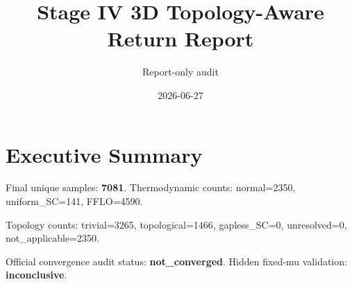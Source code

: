 \documentclass[11pt]{article}
\begin{document}
\title{Stage IV 3D Topology-Aware Return Report}
\author{Report-only audit}
\date{2026-06-27}
\maketitle
\section*{Executive Summary}
Final unique samples: \textbf{7081}. Thermodynamic counts: normal=2350, uniform\_SC=141, FFLO=4590.

Topology counts: trivial=3265, topological=1466, gapless\_SC=0, unresolved=0, not\_applicable=2350.

Official convergence audit status: \textbf{not\_converged}. Hidden fixed-mu validation: \textbf{inconclusive}.
\end{document}
